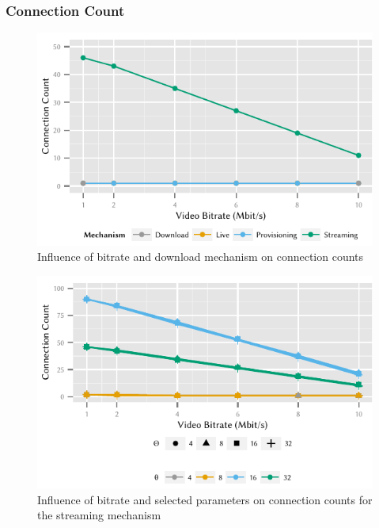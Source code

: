 \subsubsection*{Connection Count}\label{sec:application:lte_video:connection_count}

\begin{figure}
  \centering
  \includegraphics{application/lte_video/numerical_evaluation/figures/bitrate2connections}
  \caption{Influence of bitrate and download mechanism on connection counts}
  \label{fig:application:lte_video:numerical_evaluation:energy_consumption:bitrate2connections}
\end{figure}

\begin{figure}
  \centering
  \includegraphics{application/lte_video/numerical_evaluation/figures/bitrate2connections_parameters}
  \caption{Influence of bitrate and selected parameters on connection counts for the streaming mechanism}
  \label{fig:application:lte_video:numerical_evaluation:energy_consumption:bitrate2connections_parameters}
\end{figure}